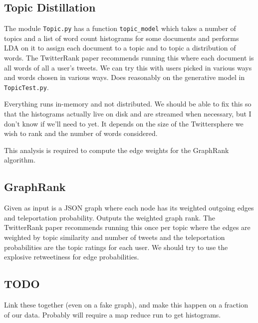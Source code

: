 

\subsection*{Topic Distillation}

The module \texttt{Topic.py} has a function \texttt{topic\_model} which takes a number of topics and a list of word count histograms for some documents and performs LDA on it to assign each document to a topic and to topic a distribution of words.
The TwitterRank paper recommends running this where each document is all words of all a user's tweets.  
We can try this with users picked in various ways and words chosen in various ways.  
Does reasonably on the generative model in \texttt{TopicTest.py}.

Everything runs in-memory and not distributed.
We should be able to fix this so that the histograms actually live on disk and are streamed when necessary, but I don't know if we'll need to yet.  It depends on the size of the Twittersphere we wish to rank and the number of words considered.  

This analysis is required to compute the edge weights for the GraphRank algorithm.  


\subsection*{GraphRank}

Given as input is a JSON graph where each node has its weighted outgoing edges and teleportation probability.
Outputs the weighted graph rank.  
The TwitterRank paper recommends running this once per topic where the edges are weighted by topic similarity and number of tweets and the teleportation probabilities are the topic ratings for each user.  
We should try to use the explosive retweetiness for edge probabilities.  

\subsection*{TODO}

Link these together (even on a fake graph), and make this happen on a fraction of our data.
Probably will require a map reduce run to get histograms.  
